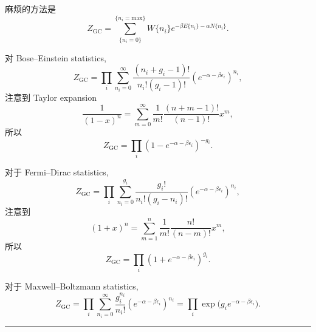 \begin{itemize}
	\begin{tcolorbox}[title=calculation:]
		麻烦的方法是
		\begin{equation}
			Z_\text{GC} = \sum_{\{n_i = 0\}}^{\{n_i = \text{max}\}} W\{n_i\} e^{- \beta E\{n_i\} - \alpha N\{n_i\}}.
		\end{equation}
		
		\noindent\hdashrule[0.5ex]{\linewidth}{0.5pt}{1mm} %
		
		对 Bose--Einstein statistics,
		\begin{equation} \label{6.1.12}
			Z_\text{GC} = \prod_i \sum_{n_i = 0}^\infty \frac{(n_i + g_i - 1)!}{n_i! (g_i - 1)!} (e^{- \alpha - \beta \epsilon_i})^{n_i},
		\end{equation}
		注意到 Taylor expansion
		\begin{equation}
			\frac{1}{(1 - x)^n} = \sum_{m = 0}^\infty \frac{1}{m!} \frac{(n + m - 1)!}{(n - 1)!} x^m,
		\end{equation}
		所以
		\begin{equation}
			Z_\text{GC} = \prod_i (1 - e^{- \alpha - \beta \epsilon_i})^{- g_i}.
		\end{equation}
		
		\noindent\hdashrule[0.5ex]{\linewidth}{0.5pt}{1mm} %
		
		对于 Fermi--Dirac statistics,
		\begin{equation}
			Z_\text{GC} = \prod_i \sum_{n_i = 0}^{g_i} \frac{g_i!}{n_i! (g_i - n_i)!} (e^{- \alpha - \beta \epsilon_i})^{n_i},
		\end{equation}
		注意到
		\begin{equation}
			(1 + x)^n = \sum_{m = 1}^n \frac{1}{m!} \frac{n!}{(n - m)!} x^m,
		\end{equation}
		所以
		\begin{equation}
			Z_\text{GC} = \prod_i (1 + e^{- \alpha - \beta \epsilon_i})^{g_i}.
		\end{equation}
		
		\noindent\hdashrule[0.5ex]{\linewidth}{0.5pt}{1mm} %
		
		对于 Maxwell--Boltzmann statistics,
		\begin{equation} \label{6.1.18}
			Z_\text{GC} = \prod_i \sum_{n_i = 0}^\infty \frac{g_i^{n_i}}{n_i!} (e^{- \alpha - \beta \epsilon_i})^{n_i} = \prod_i \exp \Big( g_i e^{- \alpha - \beta \epsilon_i} \Big).
		\end{equation}
		
		\noindent\rule[0.5ex]{\linewidth}{0.5pt} %
		

\end{tcolorbox}
\end{itemize}
